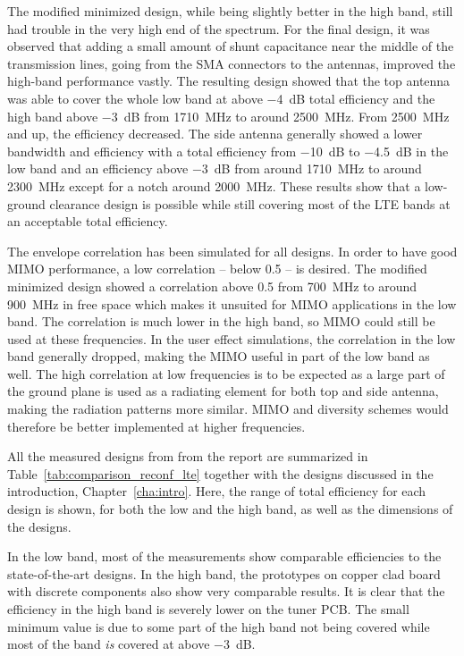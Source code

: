 The modified minimized design, while being slightly better in the high band, still had trouble in the very high end of the spectrum. For the final design, it was observed that adding a small amount of shunt capacitance near the middle of the transmission lines, going from the SMA connectors to the antennas, improved the high-band performance vastly. The resulting design showed that the top antenna was able to cover the whole low band at above \SI{-4}{dB} total efficiency and the high band above \SI{-3}{dB} from \SI{1710}{MHz} to around \SI{2500}{MHz}. From \SI{2500}{MHz} and up, the efficiency decreased. The side antenna generally showed a lower bandwidth and efficiency with a total efficiency from \SI{-10}{dB} to \SI{-4.5}{dB} in the low band and an efficiency above \SI{-3}{dB} from around \SI{1710}{MHz} to around \SI{2300}{MHz} except for a notch around \SI{2000}{MHz}. These results show that a low-ground clearance design is possible while still covering most of the LTE bands at an acceptable total efficiency.

The envelope correlation has been simulated for all designs. In order to have good MIMO performance, a low correlation -- below 0.5 -- is desired. The modified minimized design showed a correlation above 0.5 from \SI{700}{MHz} to around \SI{900}{MHz} in free space which makes it unsuited for MIMO applications in the low band. The correlation is much lower in the high band, so MIMO could still be used at these frequencies. In the user effect simulations, the correlation in the low band generally dropped, making the MIMO useful in part of the low band as well. The high correlation at low frequencies is to be expected as a large part of the ground plane is used as a radiating element for both top and side antenna, making the radiation patterns more similar. MIMO and diversity schemes would therefore be better implemented at higher frequencies.

\newpage



All the measured designs from from the report are summarized in Table~\ref{tab:comparison_reconf_lte} together with the designs discussed in the introduction, Chapter~\ref{cha:intro}. Here, the range of total efficiency for each design is shown, for both the low and the high band, as well as the dimensions of the designs. 

In the low band, most of the measurements show comparable efficiencies to the state-of-the-art designs. In the high band, the prototypes on copper clad board with discrete components also show very comparable results. It is clear that the efficiency in the high band is severely lower on the tuner PCB. The small minimum value is due to some part of the high band not being covered while most of the band \emph{is} covered at above \SI{-3}{dB}.

